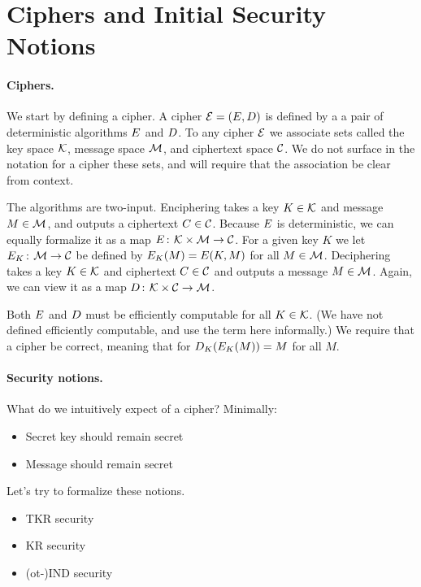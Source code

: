 \section{Ciphers and Initial Security Notions}
\label{sec:se}

\paragraph{Ciphers.}
We start by defining a cipher. A cipher ${\cal E} = (E,D)$ is
defined by a a pair of deterministic algorithms $E$ and $D$.  To
any cipher ${\cal E}$ we associate sets called the key space ${\cal K}$, message
space ${\cal M}$, and ciphertext space ${\cal C}$. We do not surface in the
notation for a cipher these sets, and will require that the association be clear
from context.

The algorithms are two-input. Enciphering takes a key $K \in {\cal K}$ and
message $M \in {\cal M}$, and outputs a ciphertext $C \in {\cal C}$. Because
$E$ is deterministic, we can equally formalize it as a map 
$E{{\kern .05em}\colon{\kern .05em}}{\cal K}\times{\cal M}\rightarrow{\cal C}$. For a given key
$K$ we let $E_K{{\kern .05em}\colon{\kern .05em}}{\cal M}\rightarrow{\cal C}$ be defined by
$E_K(M) = E(K,M)$ for all $M \in {\cal M}$.  Deciphering takes a key $K\in {\cal K}$ and ciphertext
$C \in {\cal C}$ and outputs a message $M \in {\cal M}$. Again, we can view
it as a map $D{{\kern .05em}\colon{\kern .05em}}{\cal K}\times{\cal C}\rightarrow{\cal M}$. 

Both $E$ and $D$ must be efficiently computable for all $K \in
{\cal K}$.  (We have not defined efficiently computable, and use the term here
informally.) We require that a cipher be correct, meaning that for
$D_K(E_K(M)) = M$ for all $M$. 

\paragraph{Security notions.} What do we intuitively expect of a cipher?
Minimally:
\begin{itemize}
\item Secret key should remain secret
\item Message should remain secret
\end{itemize}
Let's try to formalize these notions.
\begin{itemize}
\item TKR security
\item KR security
\item (ot-)IND security
\end{itemize}


